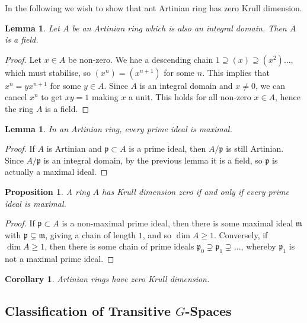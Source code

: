 \documentclass{article}
\theoremstyle{plain}
\newtheorem{proposition}[theorem]{Proposition}
\newtheorem{lemma}[theorem]{Lemma}
\newtheorem{corollary}[theorem]{Corollary}
\theoremstyle{definition}
\begin{document}
\noindent In the following we wish to show that ant Artinian ring has zero Krull dimension.

\begin{lemma}
Let $A$ be an Artinian ring which is also an integral domain. Then $A$ is a field.
\end{lemma}
\begin{proof}
    Let $x\in A$ be non-zero. We hae a descending chain $1\supseteq (x) \supseteq (x^2) ...$, which must stabilise, so $(x^n) = (x^{n+1})$ for some $n$.
    This implies that $x^n = yx^{n+1}$ for some $y\in A$. 
    Since $A$ is an integral domain and $x\neq 0$, we can cancel $x^n$ to get $xy = 1$ making $x$ a unit. 
    This holds for all non-zero $x\in A$, hence the ring $A$ is a field.
\end{proof}
\begin{lemma}
    In an Artinian ring, every prime ideal is maximal.
\end{lemma}
\begin{proof}
    If $A$ is Artinian and $\mathfrak{p}\subset A$ is a prime ideal, then $A/\mathfrak{p}$ is still Artinian.
    Since $A/\mathfrak{p}$ is an integral domain, by the previous lemma it is a field, so $\mathfrak{p}$ is actually a maximal ideal.
\end{proof}
\begin{proposition}
    A ring $A$ has Krull dimension zero if and only if every prime ideal is maximal.
\end{proposition}
\begin{proof}
    If $\mathfrak{p}\subset A$ is a non-maximal prime ideal, then there is some maximal ideal $\mathfrak{m}$ with $\mathfrak{p}\subsetneq\mathfrak{m}$, giving a chain of length $1$, and so $\dim A \geq 1$.
    Conversely, if $\dim A \geq 1$, then there is some chain of prime ideals $\mathfrak{p}_0 \supsetneq \mathfrak{p}_1\supsetneq ...$, whereby $\mathfrak{p}_1$ is not a maximal prime ideal. 
\end{proof}

\begin{corollary}
\label{Artin_zero_dim}
    Artinian rings have zero Krull dimension.
\end{corollary}


\subsection{Classification of Transitive $G$-Spaces}
\end{document}
